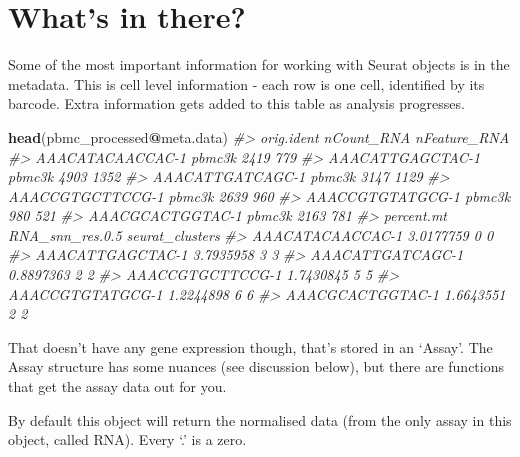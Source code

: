 \documentclass[
]{book}
\newenvironment{Shaded}{\begin{snugshade}}{\end{snugshade}}
\newcommand{\CommentTok}[1]{\textcolor[rgb]{0.56,0.35,0.01}{\textit{#1}}}
\newcommand{\FunctionTok}[1]{\textcolor[rgb]{0.13,0.29,0.53}{\textbf{#1}}}
\newcommand{\NormalTok}[1]{#1}
\newcommand{\SpecialCharTok}[1]{\textcolor[rgb]{0.81,0.36,0.00}{\textbf{#1}}}
\begin{document}
\hypertarget{whats-in-there}{%
\section{What's in there?}\label{whats-in-there}}

Some of the most important information for working with Seurat objects is in the metadata.
This is cell level information - each row is one cell, identified by its barcode.
Extra information gets added to this table as analysis progresses.

\begin{Shaded}
\begin{Highlighting}[]
\FunctionTok{head}\NormalTok{(pbmc\_processed}\SpecialCharTok{@}\NormalTok{meta.data)}
\CommentTok{\#\textgreater{}                  orig.ident nCount\_RNA nFeature\_RNA}
\CommentTok{\#\textgreater{} AAACATACAACCAC{-}1     pbmc3k       2419          779}
\CommentTok{\#\textgreater{} AAACATTGAGCTAC{-}1     pbmc3k       4903         1352}
\CommentTok{\#\textgreater{} AAACATTGATCAGC{-}1     pbmc3k       3147         1129}
\CommentTok{\#\textgreater{} AAACCGTGCTTCCG{-}1     pbmc3k       2639          960}
\CommentTok{\#\textgreater{} AAACCGTGTATGCG{-}1     pbmc3k        980          521}
\CommentTok{\#\textgreater{} AAACGCACTGGTAC{-}1     pbmc3k       2163          781}
\CommentTok{\#\textgreater{}                  percent.mt RNA\_snn\_res.0.5 seurat\_clusters}
\CommentTok{\#\textgreater{} AAACATACAACCAC{-}1  3.0177759               0               0}
\CommentTok{\#\textgreater{} AAACATTGAGCTAC{-}1  3.7935958               3               3}
\CommentTok{\#\textgreater{} AAACATTGATCAGC{-}1  0.8897363               2               2}
\CommentTok{\#\textgreater{} AAACCGTGCTTCCG{-}1  1.7430845               5               5}
\CommentTok{\#\textgreater{} AAACCGTGTATGCG{-}1  1.2244898               6               6}
\CommentTok{\#\textgreater{} AAACGCACTGGTAC{-}1  1.6643551               2               2}
\end{Highlighting}
\end{Shaded}

That doesn't have any gene expression though, that's stored in an `Assay'.
The Assay structure has some nuances (see discussion below), but there are functions that get the assay data out for you.

By default this object will return the normalised data (from the only assay in this object, called RNA). Every `.' is a zero.
\end{document}
